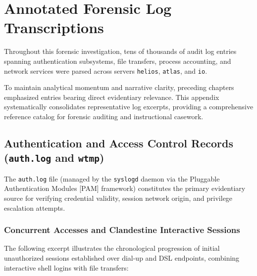 \chapter{Annotated Forensic Log Transcriptions}
\label{apendice:bitacoras}

Throughout this forensic investigation, tens of thousands of audit log entries spanning authentication subsystems, file transfers, process accounting, and network services were parsed across servers \texttt{helios}, \texttt{atlas}, and \texttt{io}.

To maintain analytical momentum and narrative clarity, preceding chapters emphasized entries bearing direct evidentiary relevance. This appendix systematically consolidates representative log excerpts, providing a comprehensive reference catalog for forensic auditing and instructional casework.

\section{Authentication and Access Control Records (\texttt{auth.log} and \texttt{wtmp})}

The \texttt{auth.log} file (managed by the \texttt{syslogd} daemon via the Pluggable Authentication Modules [PAM] framework) constitutes the primary evidentiary source for verifying credential validity, session network origin, and privilege escalation attempts.

\subsection{Concurrent Accesses and Clandestine Interactive Sessions}

The following excerpt illustrates the chronological progression of initial unauthorized sessions established over dial-up and DSL endpoints, combining interactive shell logins with file transfers:

